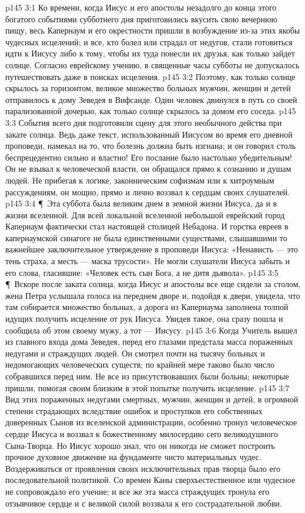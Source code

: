 \vs p145 3:1 Ко времени, когда Иисус и его апостолы незадолго до конца этого богатого событиями субботнего дня приготовились вкусить свою вечернюю пищу, весь Капернаум и его окрестности пришли в возбуждение из\hyp{}за этих якобы чудесных исцелений; и все, кто болел или страдал от недугов, стали готовиться идти к Иисусу либо к тому, чтобы их туда понесли их друзья, как только зайдет солнце. Согласно еврейскому учению, в священные часы субботы не допускалось путешествовать даже в поисках исцеления.
\vs p145 3:2 Поэтому, как только солнце скрылось за горизонтом, великое множество больных мужчин, женщин и детей отправилось к дому Зеведея в Вифсаиде. Один человек двинулся в путь со своей парализованной дочерью, как только солнце скрылось за домом его соседа.
\vs p145 3:3 События всего дня подготовили сцену для этого необычного действа при закате солнца. Ведь даже текст, использованный Иисусом во время его дневной проповеди, намекал на то, что болезнь должна быть изгнана; и он говорил столь беспрецедентно сильно и властно! Его послание было настолько убедительным! Он не взывал к человеческой власти, он обращался прямо к сознанию и душам людей. Не прибегая к логике, законническим софизмам или к хитроумным рассуждениям, он мощно, прямо и лично воззвал к сердцам своих слушателей.
\vs p145 3:4 \P\ Эта суббота была великим днем в земной жизни Иисуса, да и в жизни вселенной. Для всей локальной вселенной небольшой еврейский город Капернаум фактически стал настоящей столицей Небадона. И горстка евреев в капернаумской синагоге не была единственными существами, слышавшими то важнейшее заключительное утверждение в проповеди Иисуса: «Ненависть --- это тень страха, а месть --- маска трусости». Не могли слушатели Иисуса забыть и его слова, гласившие: «Человек есть сын Бога, а не дитя дьявола».
\vs p145 3:5 \P\ Вскоре после заката солнца, когда Иисус и апостолы все еще сидели за столом, жена Петра услышала голоса на переднем дворе и, подойдя к двери, увидела, что там собирается множество больных, а дорога из Капернаума заполнена толпой идущих получить исцеление от рук Иисуса. Увидев такое, она сразу пошла и сообщила об этом своему мужу, а тот --- Иисусу.
\vs p145 3:6 Когда Учитель вышел из главного входа дома Зеведея, перед его глазами предстала масса пораженных недугами и страждущих людей. Он смотрел почти на тысячу больных и недомогающих человеческих существ; по крайней мере таково было число собравшихся перед ним. Не все из присутствовавших были больны; некоторые пришли, помогая своим близким в этой попытке получить исцеление.
\vs p145 3:7 Вид этих пораженных недугами смертных, мужчин, женщин и детей, в огромной степени страдающих вследствие ошибок и проступков его собственных доверенных Сынов из вселенской администрации, особенно тронул человеческое сердце Иисуса и воззвал к божественному милосердию сего великодушного Сына\hyp{}Творца. Но Иисус хорошо знал, что он никогда не сможет построить прочное духовное движение на фундаменте чисто материальных чудес. Воздерживаться от проявления своих исключительных прав творца было его последовательной политикой. Со времен Каны сверхъестественное или чудесное не сопровождало его учение; и все же эта масса страждущих тронула его отзывчивое сердце и с великой силой воззвала к его сострадательной любви.
